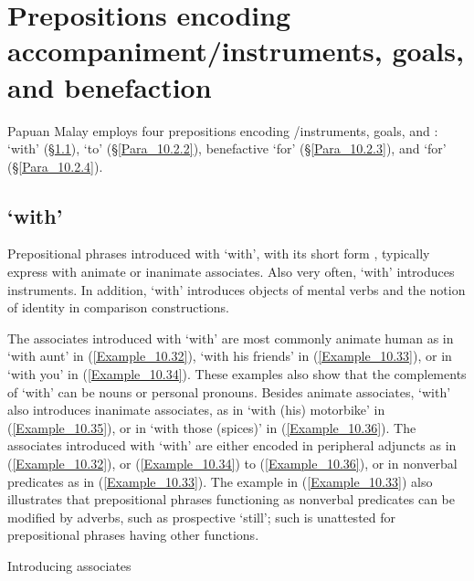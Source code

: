 \section{Prepositions encoding {accompaniment}/instruments, goals, and benefaction}
\label{Para_10.2}
Papuan Malay employs four prepositions encoding /instruments, goals, and :   ‘with’ (§\ref{Para_10.2.1}),   ‘to’ (§\ref{Para_10.2.2}), benefactive  ‘for’ (§\ref{Para_10.2.3}), and  ‘for’ (§\ref{Para_10.2.4}).


\subsection{ ‘with’}
\label{Para_10.2.1}
Prepositional phrases introduced with   ‘with’, with its short form , typically express  with animate or inanimate associates. Also very often,  ‘with’ introduces instruments. In addition,  ‘with’ introduces objects of mental verbs and the notion of identity in comparison constructions.



The associates introduced with  ‘with’ are most commonly animate human as in  ‘with aunt’ in (\ref{Example_10.32}),  ‘with his friends’ in (\ref{Example_10.33}), or in  ‘with you’ in (\ref{Example_10.34}). These examples also show that the complements of  ‘with’ can be nouns or personal pronouns. Besides animate associates,  ‘with’ also introduces inanimate associates, as in  ‘with (his) motorbike’ in (\ref{Example_10.35}), or in   ‘with those (spices)’ in (\ref{Example_10.36}). The associates introduced with  ‘with’ are either encoded in peripheral adjuncts as in (\ref{Example_10.32}), or (\ref{Example_10.34}) to (\ref{Example_10.36}), or in nonverbal predicates as in (\ref{Example_10.33}). The example in (\ref{Example_10.33}) also illustrates that prepositional phrases functioning as nonverbal predicates can be modified by adverbs, such as prospective  ‘still’; such  is unattested for prepositional phrases having other functions.


\begin{styleExampleTitle}
Introducing associates
\end{styleExampleTitle}

